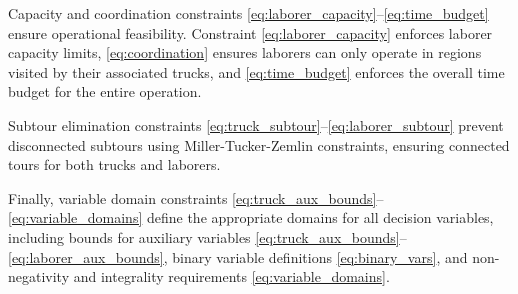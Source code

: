 Capacity and coordination constraints \eqref{eq:laborer_capacity}--\eqref{eq:time_budget} ensure operational feasibility. Constraint \eqref{eq:laborer_capacity} enforces laborer capacity limits, \eqref{eq:coordination} ensures laborers can only operate in regions visited by their associated trucks, and \eqref{eq:time_budget} enforces the overall time budget for the entire operation.

\sloppy Subtour elimination constraints \eqref{eq:truck_subtour}--\eqref{eq:laborer_subtour} prevent disconnected subtours using Miller-Tucker-Zemlin \cite{miller1960subtour} constraints, ensuring connected tours for both trucks and laborers.

Finally, variable domain constraints \eqref{eq:truck_aux_bounds}--\eqref{eq:variable_domains} define the appropriate domains for all decision variables, including bounds for auxiliary variables \eqref{eq:truck_aux_bounds}--\eqref{eq:laborer_aux_bounds}, binary variable definitions \eqref{eq:binary_vars}, and non-negativity and integrality requirements \eqref{eq:variable_domains}.

